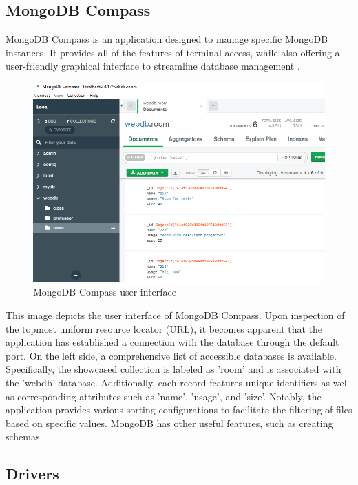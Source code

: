 \subsection{MongoDB Compass}

MongoDB Compass is an application designed to manage specific MongoDB instances. It provides all of the features of terminal access, while also offering a user-friendly graphical interface to streamline database management \parencite{mujdrica_compass}.

\begin{figure}[H]
    \centering
    \caption{MongoDB Compass user interface} \label{fig:compass}
    \includegraphics[width=1.0\textwidth]{images/mujdrica/compass.png}
\end{figure}

This image depicts the user interface of MongoDB Compass. Upon inspection of the topmost uniform resource locator (URL), it becomes apparent that the application has established a connection with the database through the default port. On the left side, a comprehensive list of accessible databases is available. Specifically, the showcased collection is labeled as 'room' and is associated with the 'webdb' database. Additionally, each record features unique identifiers as well as corresponding attributes such as 'name', 'usage', and 'size'. Notably, the application provides various sorting configurations to facilitate the filtering of files based on specific values. MongoDB has other useful features, such as creating schemas.

\subsection{Drivers}

